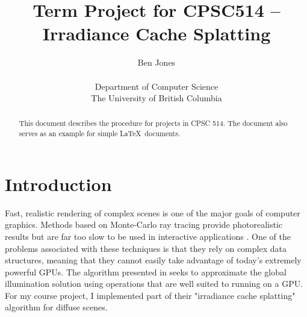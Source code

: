 \documentclass[10pt,twopage]{acmsiggraph}
\begin{document}
%
%

\title{Term Project for CPSC514 -- Irradiance Cache Splatting}

\newcommand\name{Ben Jones}

\author{\name\\
\\
Department of Computer Science\\
The University of British Columbia}

\maketitle

%
%

\begin{abstract}
  This document describes the procedure for projects in CPSC 514. The
  document also serves as an example for simple \LaTeX\ documents.
\end{abstract}

%
%

\section{Introduction}
\label{Intro}

Fast, realistic rendering of complex scenes is one of the major goals of computer graphics.  Methods based on Monte-Carlo ray tracing provide photorealistic results but are far too slow to be used in interactive applications \cite{cook1984distributed}.  One of the problems associated with these techniques is that they rely on complex data structures, meaning that they cannot easily take advantage of today's extremely powerful GPUs.  The algorithm presented in \cite{mainpaper} seeks to approximate the global illumination solution using operations that are well suited to running on a GPU.  For my course project, I implemented part of their "irradiance cache splatting" algorithm for diffuse scenes.
\end{document}
